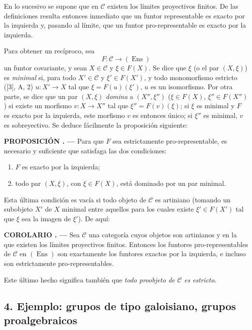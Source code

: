 \documentclass[11pt,twoside,openany]{book}
\numberwithin{equation}{section}
\newcommand{\src}[1]{%
  \phantomsection\hypertarget{src:#1}{}%
  \marginpar{\raggedleft\footnotesize\sffamily #1}%
}
\theoremstyle{plain}
\theoremstyle{definition}
\theoremstyle{remark}
\newcommand{\result}[2]{%
  \par\medskip\noindent\textbf{#1%
  \if\relax\detokenize{#2}\relax\else\space#2\fi. ---}\enspace
}
\newcommand{\FgaUnitKey}{frontmatter}
\renewcommand{\src}[1]{%
  \phantomsection\hypertarget{src:\FgaUnitKey:#1}{}%
  \marginpar{\raggedleft\footnotesize\sffamily #1}%
}
\theoremstyle{plain}
\theoremstyle{definition}
\theoremstyle{remark}
\begin{document}
En lo sucesivo se supone que en $\mathcal C$ existen los límites proyectivos
finitos. De las definiciones resulta entonces inmediato que un funtor
representable es exacto por la izquierda y, pasando al límite, que un funtor
pro-representable es exacto por la izquierda.

Para obtener un recíproco, sea
\[
  F:\mathcal C\longrightarrow(\operatorname{Ens})
\]
un funtor covariante, y sean $X\in\mathcal C$ y $\xi\in F(X)$. Se dice que
$\xi$ (o el par \src{374}$(X,\xi)$) es \emph{minimal} si, para todo
$X'\in\mathcal C$ y $\xi'\in F(X')$, y todo monomorfismo estricto ([3], A, 2)
$u:X'\longrightarrow X$ tal que $\xi=F(u)(\xi')$, $u$ es un isomorfismo. Por
otra parte, se dice que un par $(X,\xi)$ \emph{domina} a $(X'',\xi'')$
($\xi\in F(X)$, $\xi''\in F(X'')$) si existe un morfismo
$v:X\longrightarrow X''$ tal que $\xi''=F(v)(\xi)$; si $\xi$ es minimal y $F$
es exacto por la izquierda, este morfismo $v$ es entonces único; si $\xi''$ es
minimal, $v$ es sobreyectivo. Se deduce fácilmente la proposición siguiente:

\result{PROPOSICIÓN}{3.1} Para que $F$ sea estrictamente pro-representable, es
necesario y suficiente que satisfaga las dos condiciones:
\begin{enumerate}
\item[(i)] $F$ es exacto por la izquierda;
\item[(ii)] todo par $(X,\xi)$, con $\xi\in F(X)$, está dominado por un par
minimal.
\end{enumerate}

Esta última condición es vacía si todo objeto de $\mathcal C$ es artiniano
(tomando un subobjeto $X'$ de $X$ minimal entre aquellos para los cuales existe
$\xi'\in F(X')$ tal que $\xi$ sea la imagen de $\xi'$). De aquí:

\result{COROLARIO}{} Sea $\mathcal C$ una categoría cuyos objetos son
artinianos y en la que existen los límites proyectivos finitos. Entonces los
funtores pro-representables de $\mathcal C$ en $(\operatorname{Ens})$ son
exactamente los funtores exactos por la izquierda, e incluso son estrictamente
pro-representables.

Este último hecho significa también que \emph{todo proobjeto de $\mathcal C$
es estricto}.

\subsection*{4. Ejemplo: grupos de tipo galoisiano, grupos proalgebraicos}
\end{document}

